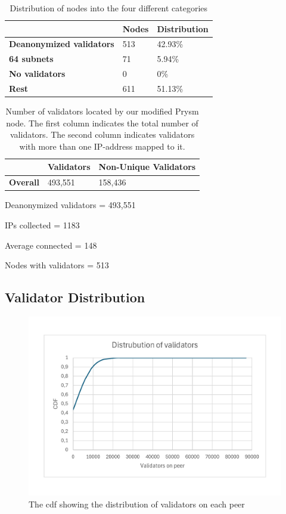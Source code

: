\begin{table}[]
    \centering
    \caption{Distribution of nodes into the four different categories}
    \begin{tabular}{lll}
        \hline
        & \textbf{Nodes} & \textbf{Distribution} \\ \hline
        \textbf{Deanonymized validators} & 513            & 42.93\%                 \\
        \textbf{64 subnets}              & 71             & 5.94\%                  \\
        \textbf{No validators}           & 0              & 0\%                     \\
        \textbf{Rest}                    & 611            & 51.13\%                 \\ \hline
    \end{tabular}
    \label{tab:distribution}
\end{table}


\begin{table}[]
    \centering
    \caption{Number of validators located by our modified Prysm node. The first column indicates the total number of validators. The second column indicates validators with more than one IP-address mapped to it.}
    \begin{tabular}{lll}
        \hline
        & \textbf{Validators} & \textbf{Non-Unique Validators} \\ \hline
        \textbf{Overall} & 493,551             & 158,436                        \\ \hline
    \end{tabular}
    \label{tab:unique vals}
\end{table}



Deanonymized validators = 493,551

IPs collected = 1183

Average connected = 148

Nodes with validators = 513

\subsection{Validator Distribution}\label{subsec:validator-distribution}
\begin{figure}[!ht]
    \includegraphics[width=\linewidth]{figures/cdf}
    \caption{The cdf showing the distribution of validators on each peer}
    \label{fig:validatorsonpeers}
\end{figure}